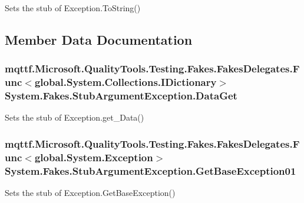 Sets the stub of Exception.\-To\-String()



\subsection{Member Data Documentation}
\hypertarget{class_system_1_1_fakes_1_1_stub_argument_exception_a11d648c97761cacfc9c0afa8bcfdcf0f}{
\subsubsection[{Data\-Get}]{\setlength{\rightskip}{0pt plus 5cm}mqttf.\-Microsoft.\-Quality\-Tools.\-Testing.\-Fakes.\-Fakes\-Delegates.\-Func$<$global.\-System.\-Collections.\-I\-Dictionary$>$ System.\-Fakes.\-Stub\-Argument\-Exception.\-Data\-Get}}\label{class_system_1_1_fakes_1_1_stub_argument_exception_a11d648c97761cacfc9c0afa8bcfdcf0f}


Sets the stub of Exception.\-get\-\_\-\-Data()

\hypertarget{class_system_1_1_fakes_1_1_stub_argument_exception_abe8e0f0c2975c3b8c0eae4c649b46c9b}{
\subsubsection[{Get\-Base\-Exception01}]{\setlength{\rightskip}{0pt plus 5cm}mqttf.\-Microsoft.\-Quality\-Tools.\-Testing.\-Fakes.\-Fakes\-Delegates.\-Func$<$global.\-System.\-Exception$>$ System.\-Fakes.\-Stub\-Argument\-Exception.\-Get\-Base\-Exception01}}\label{class_system_1_1_fakes_1_1_stub_argument_exception_abe8e0f0c2975c3b8c0eae4c649b46c9b}


Sets the stub of Exception.\-Get\-Base\-Exception()

